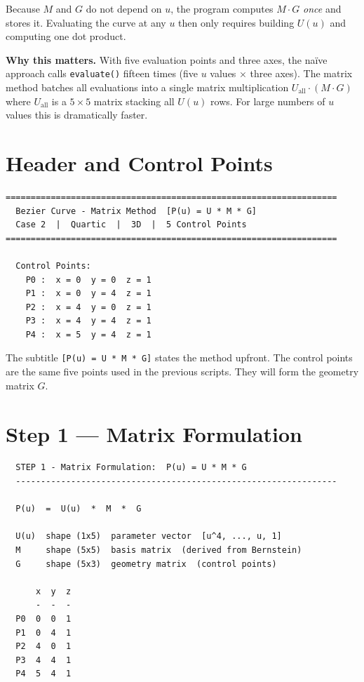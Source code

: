 \documentclass[12pt, a4paper]{article}
\newcommand{\cd}[1]{\texttt{#1}}
\begin{document}
\medskip
Because $M$ and $G$ do not depend on $u$, the program
computes $M \cdot G$ \emph{once} and stores it.
Evaluating the curve at any $u$ then only requires
building $U(u)$ and computing one dot product.

\begin{notebox}
\textbf{Why this matters.}
With five evaluation points and three axes,
the na\"ive approach calls \cd{evaluate()} fifteen times
(five $u$ values $\times$ three axes).
The matrix method batches all evaluations into a single
matrix multiplication $U_{\text{all}} \cdot (M \cdot G)$
where $U_{\text{all}}$ is a $5 \times 5$ matrix stacking
all $U(u)$ rows.
For large numbers of $u$ values this is dramatically faster.
\end{notebox}


\section{Header and Control Points}

\begin{verbatim}
==================================================================
  Bezier Curve - Matrix Method  [P(u) = U * M * G]
  Case 2  |  Quartic  |  3D  |  5 Control Points
==================================================================

  Control Points:
    P0 :  x = 0  y = 0  z = 1
    P1 :  x = 0  y = 4  z = 1
    P2 :  x = 4  y = 0  z = 1
    P3 :  x = 4  y = 4  z = 1
    P4 :  x = 5  y = 4  z = 1
\end{verbatim}

The subtitle \cd{[P(u) = U * M * G]} states the method upfront.
The control points are the same five points used in the
previous scripts.
They will form the geometry matrix $G$.


\section{Step 1 --- Matrix Formulation}

\begin{verbatim}
  STEP 1 - Matrix Formulation:  P(u) = U * M * G
  ----------------------------------------------------------------

  P(u)  =  U(u)  *  M  *  G

  U(u)  shape (1x5)  parameter vector  [u^4, ..., u, 1]
  M     shape (5x5)  basis matrix  (derived from Bernstein)
  G     shape (5x3)  geometry matrix  (control points)

      x  y  z
      -  -  -
  P0  0  0  1
  P1  0  4  1
  P2  4  0  1
  P3  4  4  1
  P4  5  4  1
\end{verbatim}
\end{document}
